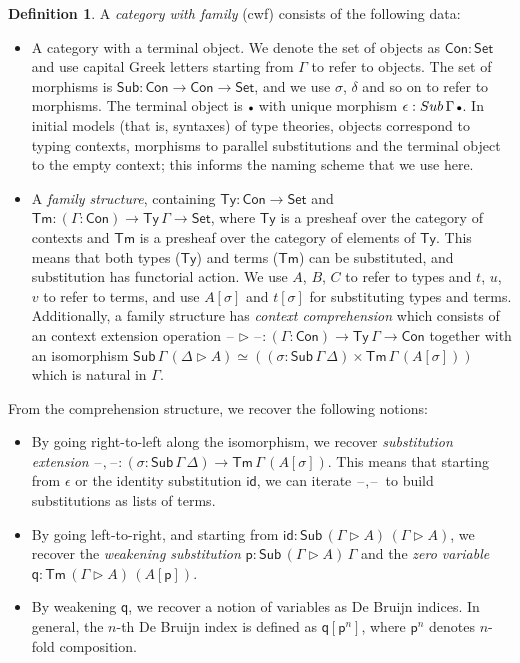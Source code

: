 \documentclass[a4paper,UKenglish,cleveref, autoref, thm-restate]{lipics-v2021}
\theoremstyle{remark}
\theoremstyle{definition}
\newtheorem{mydefinition}{Definition}
\newcommand{\Seti}{\mathsf{Set}}
\newcommand{\Con}{\mathsf{Con}}
\newcommand{\Ty}{\mathsf{Ty}}
\newcommand{\Tm}{\mathsf{Tm}}
\newcommand{\Sub}{\mathsf{Sub}}
\newcommand{\emptycon}{\scaleobj{.75}\bullet}
\newcommand{\id}{\mathsf{id}}
\newcommand{\ext}{\triangleright}
\newcommand{\blank}{\mathord{\hspace{1pt}\text{--}\hspace{1pt}}}
\newcommand{\p}{\mathsf{p}}
\newcommand{\q}{\mathsf{q}}
\begin{document}
\begin{mydefinition}
A \emph{category with family} (cwf) \cite{Dybjer96internaltype} consists of the following data:
\begin{itemize}
\item A category with a terminal object. We denote the set of objects as $\Con :
  \Seti$ and use capital Greek letters starting from $\Gamma$ to refer to
  objects. The set of morphisms is $\Sub : \Con \to \Con \to \Seti$, and we use
  $\sigma$, $\delta$ and so on to refer to morphisms. The terminal object is
  $\emptycon$ with unique morphism $\epsilon : \Sub\,\Gamma\,\emptycon$. In
  initial models (that is, syntaxes) of type theories, objects correspond to
  typing contexts, morphisms to parallel substitutions and the terminal object to
  the empty context; this informs the naming scheme that we use here.
\item A \emph{family structure}, containing $\Ty : \Con \to \Seti$ and $\Tm :
  (\Gamma : \Con) \to \Ty\,\Gamma \to \Seti$, where $\Ty$ is a presheaf over the
  category of contexts and $\Tm$ is a presheaf over the category of elements of
  $\Ty$. This means that both types ($\Ty$) and terms ($\Tm$) can be
  substituted, and substitution has functorial action. We use $A$, $B$, $C$ to
  refer to types and $t$, $u$, $v$ to refer to terms, and use $A[\sigma]$ and
  $t[\sigma]$ for substituting types and terms. Additionally, a family structure
  has \emph{context comprehension} which consists of an context extension
  operation $\blank\ext\blank : (\Gamma : \Con) \to \Ty\,\Gamma \to \Con$
  together with an isomorphism $\Sub\,\Gamma\,(\Delta\ext A) \simeq ((\sigma :
  \Sub\,\Gamma\,\Delta) \times \Tm\,\Gamma\,(A[\sigma]))$ which is natural in
  $\Gamma$.
\end{itemize}
\end{mydefinition}

\noindent From the comprehension structure, we recover the following notions:

\begin{itemize}
\item By going right-to-left along the isomorphism, we recover \emph{substitution extension}
      $\blank,\blank : (\sigma : \Sub\,\Gamma\,\Delta) \to \Tm\,\Gamma\,(A[\sigma])$. This means
      that starting from $\epsilon$ or the identity substitution $\id$, we can iterate $\blank,\blank$
      to build substitutions as lists of terms.
\item By going left-to-right, and starting from $\id : \Sub\,(\Gamma\ext A)\,(\Gamma\ext A)$, we recover
      the \emph{weakening substitution} $\p : \Sub\,(\Gamma\ext A)\,\Gamma$ and the \emph{zero variable}
      $\q : \Tm\,(\Gamma\ext A)\,(A[\p])$.
\item By weakening $\q$, we recover a notion of variables as De Bruijn indices. In general, the $n$-th
      De Bruijn index is defined as $\q[\p^{n}]$, where $\p^{n}$ denotes $n$-fold composition.
\end{itemize}
\end{document}
